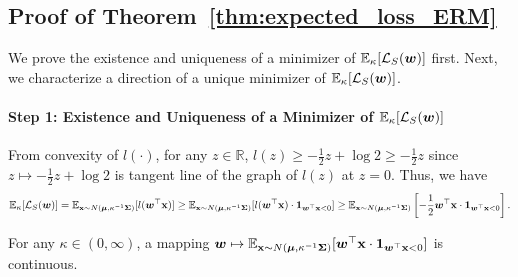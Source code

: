 \subsection{Proof of Theorem~\ref{thm:expected_loss_ERM}}\label{proof:expected_loss_ERM}
We prove the existence and uniqueness of a minimizer of $\mathbb{E}_\kappa [\mathcal{L}_S ({\bm{w}})]$ first. Next, we characterize a direction of a unique minimizer of $\mathbb{E}_\kappa [\mathcal{L}_S ({\bm{w}})]$.
\paragraph{Step 1: Existence and Uniqueness of a Minimizer of $\mathbb{E}_\kappa[\mathcal{L}_S({\bm{w}})]$}\quad

From convexity of $l(\cdot)$, for any $z \in \mathbb{R}$, $l(z) \geq -\frac{1}{2}z + \log 2 \geq -\frac{1}{2}z$ since $z \mapsto -\frac{1}{2} z + \log 2$ is tangent line of the graph of $l(z)$ at $z=0$. Thus, we have 
\begin{equation*}
    \mathbb{E}_\kappa[\mathcal{L}_S({\bm{w}})] = \mathbb{E}_{{\mathbf{x}}\sim N({\bm{\mu}},\kappa^{-1}{\bm{\Sigma}})}[l({\bm{w}}^\top {\mathbf{x}})] \geq \mathbb{E}_{{\mathbf{x}}\sim N({\bm{\mu}},\kappa^{-1}{\bm{\Sigma}})}[l({\bm{w}}^\top {\mathbf{x}}) \cdot {\bm{1}}_{{\bm{w}}^\top {\mathbf{x}} < 0} ]\geq \mathbb{E}_{{\mathbf{x}} \sim N({\bm{\mu}}, \kappa^{-1}{\bm{\Sigma}})}\left[-\frac{1}{2}{\bm{w}}^\top {\mathbf{x}} \cdot {\bm{1}}_{{\bm{w}}^\top {\mathbf{x}} < 0}\right].
\end{equation*}
\begin{claim}
\label{claim:1}
For any $\kappa \in (0, \infty)$, a mapping ${\bm{w}} \mapsto \mathbb{E}_{{\mathbf{x}} \sim N({\bm{\mu}}, \kappa^{-1}{\bm{\Sigma}})} [{\bm{w}}^\top {\mathbf{x}} \cdot {\bm{1}}_{{\bm{w}}^\top {\mathbf{x}}<0}]$ is continuous.
\end{claim}

